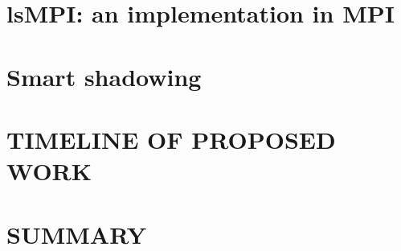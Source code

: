 \documentclass[driverfallback=dvipdfmx,final]{pittetd}
\begin{document}
\chapter{lsMPI: an implementation in MPI}
\label{chapter:implementation}


\chapter{Smart shadowing}
\label{chapter:smart}


\chapter{TIMELINE OF PROPOSED WORK}
\label{chapter:timeline}


\chapter{SUMMARY}
\label{chapter:summary}


\appendix                      
%

\begin{singlespace}

{
\footnotesize

}
\end{singlespace}
\end{document}
